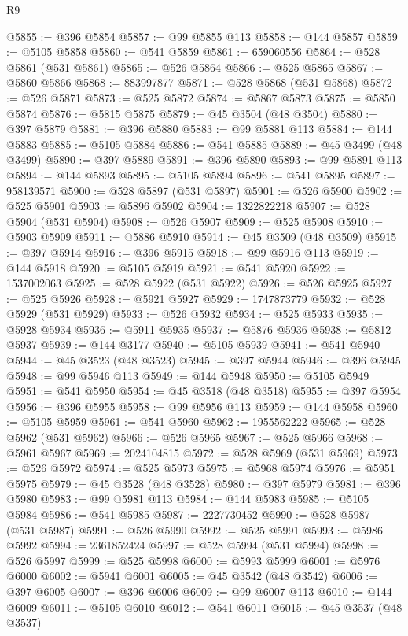 \begin{lexlean}{R9}
\begin{coremodule}
{{{{{{{{{{{{{{{{{{{{{{{{{{{{{{{{{{{{{{{{{{{{{{{{{{{{{{{{{{{{{{{{{{{{{{{{{{{{{{{{{{{{@5855 := @396 @5854
@5857 := @99 @5855 @113
@5858 := @144 @5857
@5859 := @5105 @5858
@5860 := @541 @5859
@5861 := 659060556
@5864 := @528 @5861 (@531 @5861)
@5865 := @526 @5864
@5866 := @525 @5865
@5867 := @5860 @5866
@5868 := 883997877
@5871 := @528 @5868 (@531 @5868)
@5872 := @526 @5871
@5873 := @525 @5872
@5874 := @5867 @5873
@5875 := @5850 @5874
@5876 := @5815 @5875
@5879 := @45 @3504 (@48 @3504)
@5880 := @397 @5879
@5881 := @396 @5880
@5883 := @99 @5881 @113
@5884 := @144 @5883
@5885 := @5105 @5884
@5886 := @541 @5885
@5889 := @45 @3499 (@48 @3499)
@5890 := @397 @5889
@5891 := @396 @5890
@5893 := @99 @5891 @113
@5894 := @144 @5893
@5895 := @5105 @5894
@5896 := @541 @5895
@5897 := 958139571
@5900 := @528 @5897 (@531 @5897)
@5901 := @526 @5900
@5902 := @525 @5901
@5903 := @5896 @5902
@5904 := 1322822218
@5907 := @528 @5904 (@531 @5904)
@5908 := @526 @5907
@5909 := @525 @5908
@5910 := @5903 @5909
@5911 := @5886 @5910
@5914 := @45 @3509 (@48 @3509)
@5915 := @397 @5914
@5916 := @396 @5915
@5918 := @99 @5916 @113
@5919 := @144 @5918
@5920 := @5105 @5919
@5921 := @541 @5920
@5922 := 1537002063
@5925 := @528 @5922 (@531 @5922)
@5926 := @526 @5925
@5927 := @525 @5926
@5928 := @5921 @5927
@5929 := 1747873779
@5932 := @528 @5929 (@531 @5929)
@5933 := @526 @5932
@5934 := @525 @5933
@5935 := @5928 @5934
@5936 := @5911 @5935
@5937 := @5876 @5936
@5938 := @5812 @5937
@5939 := @144 @3177
@5940 := @5105 @5939
@5941 := @541 @5940
@5944 := @45 @3523 (@48 @3523)
@5945 := @397 @5944
@5946 := @396 @5945
@5948 := @99 @5946 @113
@5949 := @144 @5948
@5950 := @5105 @5949
@5951 := @541 @5950
@5954 := @45 @3518 (@48 @3518)
@5955 := @397 @5954
@5956 := @396 @5955
@5958 := @99 @5956 @113
@5959 := @144 @5958
@5960 := @5105 @5959
@5961 := @541 @5960
@5962 := 1955562222
@5965 := @528 @5962 (@531 @5962)
@5966 := @526 @5965
@5967 := @525 @5966
@5968 := @5961 @5967
@5969 := 2024104815
@5972 := @528 @5969 (@531 @5969)
@5973 := @526 @5972
@5974 := @525 @5973
@5975 := @5968 @5974
@5976 := @5951 @5975
@5979 := @45 @3528 (@48 @3528)
@5980 := @397 @5979
@5981 := @396 @5980
@5983 := @99 @5981 @113
@5984 := @144 @5983
@5985 := @5105 @5984
@5986 := @541 @5985
@5987 := 2227730452
@5990 := @528 @5987 (@531 @5987)
@5991 := @526 @5990
@5992 := @525 @5991
@5993 := @5986 @5992
@5994 := 2361852424
@5997 := @528 @5994 (@531 @5994)
@5998 := @526 @5997
@5999 := @525 @5998
@6000 := @5993 @5999
@6001 := @5976 @6000
@6002 := @5941 @6001
@6005 := @45 @3542 (@48 @3542)
@6006 := @397 @6005
@6007 := @396 @6006
@6009 := @99 @6007 @113
@6010 := @144 @6009
@6011 := @5105 @6010
@6012 := @541 @6011
@6015 := @45 @3537 (@48 @3537)
}}}}}}}}}}}}}}}}}}}}}}}}}}}}}}}}}}}}}}}}}}}}}}}}}}}}}}}}}}}}}}}}}}}}}}}}}}}}}}}}}}}}
\end{coremodule}
\end{lexlean}
